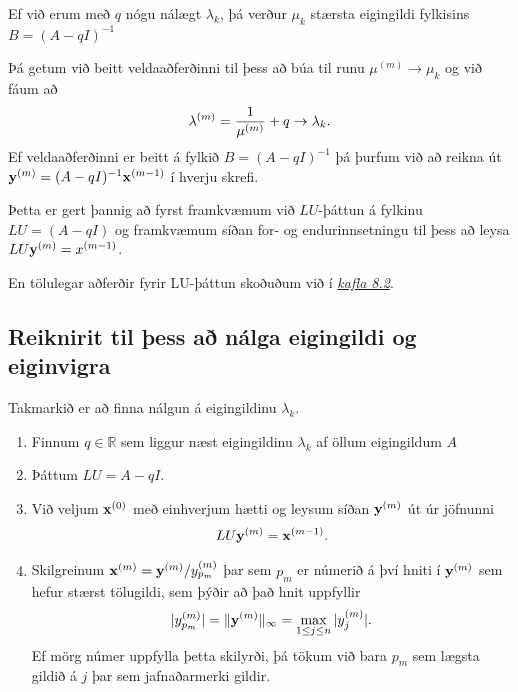 \documentclass[letterpaper,10pt,icelandic]{sphinxmanual}
\begin{document}
Ef við erum með \(q\) nógu nálægt \(\lambda_k\), þá verður
\(\mu_k\) stærsta eigingildi fylkisins \(B=(A-qI)^{-1}\)

Þá getum við beitt veldaaðferðinni til þess að búa til runu
\(\mu^{(m)}\to \mu_k\) og við fáum að
\begin{gather}
\begin{split}\lambda^{(m)}=\dfrac 1{\mu^{(m)}}+q\to \lambda_k.\end{split}\notag
\end{gather}
Ef veldaaðferðinni er beitt á fylkið \(B=(A-qI)^{-1}\) þá þurfum við
að reikna út
\({\mbox{${\bf y}$}}^{(m)}=(A-qI)^{-1}{\mbox{${\bf x}$}}^{(m-1)}\) í
hverju skrefi.

Þetta er gert þannig að fyrst framkvæmum við \(LU\)-þáttun á fylkinu
\(LU=(A-qI)\) og framkvæmum síðan for- og endurinnsetningu til þess
að leysa \(LU{\mbox{${\bf y}$}}^{(m)}=x^{(m-1)}\).

En tölulegar aðferðir fyrir LU-þáttun skoðuðum við í
{\hyperref[kafli08:upphafsgildisverkefni]{\emph{kafla 8.2}}}.


\subsection{Reiknirit til þess að nálga eigingildi og eiginvigra}
\label{kafli09:reiknirit-til-ess-a-nalga-eigingildi-og-eiginvigra}
Takmarkið er að finna nálgun á eigingildinu \(\lambda_k\).
\begin{enumerate}
\item {} 
Finnum \(q\in {{\mathbb  R}}\) sem liggur næst eigingildinu
\(\lambda_k\) af öllum eigingildum \(A\)

\item {} 
Þáttum \(LU=A-qI\).

\item {} 
Við veljum \({\mbox{${\bf x}$}}^{(0)}\) með einhverjum hætti og
leysum síðan \({\mbox{${\bf y}$}}^{(m)}\) út úr jöfnunni
\begin{gather}
\begin{split}LU{\mbox{${\bf y}$}}^{(m)}={\mbox{${\bf x}$}}^{(m-1)}.\end{split}\notag
\end{gather}
\item {} 
Skilgreinum \({\mbox{${\bf x}$}}^{(m)}={{\mbox{${\bf y}$}}^{(m)}}/{y_{p_m}^{(m)}}\) þar sem \(p_m\) er númerið á því hniti í
\({\mbox{${\bf y}$}}^{(m)}\) sem hefur stærst tölugildi, sem
þýðir að það hnit uppfyllir
\begin{gather}
\begin{split}|y_{p_m}^{(m)}|=\|{\mbox{${\bf y}$}}^{(m)}\|_\infty=\max_{1\leq j\leq n}|y_j^{(m)}|.\end{split}\notag
\end{gather}
Ef mörg númer uppfylla þetta skilyrði, þá tökum við bara \(p_m\)
sem lægsta gildið á \(j\) þar sem jafnaðarmerki gildir.

\end{enumerate}
\end{document}
